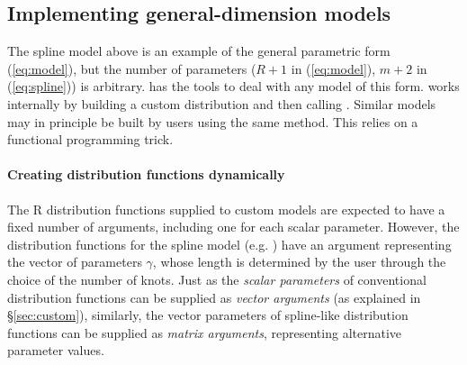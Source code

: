 \documentclass[nojss,nofooter]{jss}
\begin{document}
\subsection{Implementing general-dimension models}
\label{sec:gdim}

The spline model above is an example of the general parametric form
(\ref{eq:model}), but the number of parameters ($R+1$ in
(\ref{eq:model}), $m+2$ in (\ref{eq:spline})) is arbitrary.
 has the tools to deal with any model of this form.
 works internally by building a custom
distribution and then calling .  Similar models may
in principle be built by users using the same method.  This relies on
a functional programming trick.

\paragraph{Creating distribution functions dynamically}

The R distribution functions supplied to custom models are expected to
have a fixed number of arguments, including one for each scalar
parameter.  However, the distribution functions for the spline model
(e.g. ) have an argument  representing
the vector of parameters $\gamma$, whose length is determined by the
user through the choice of the number of knots.  Just as the
\emph{scalar parameters} of conventional distribution functions can be
supplied as \emph{vector arguments} (as explained in
\S\ref{sec:custom}), similarly, the vector parameters of spline-like
distribution functions can be supplied as \emph{matrix arguments},
representing alternative parameter values.
\end{document}
